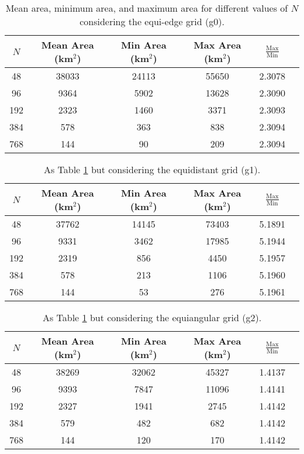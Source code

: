 \begin{table}[htbp]
    \centering
    \caption{Mean area, minimum area, and maximum area for different values of $N$ considering the equi-edge grid (g0).\label{g0-da-table}}
    \begin{tabular}{cccccc}
        \toprule
        $N$ & Mean Area (km$^2$) & Min Area (km$^2$) & Max Area (km$^2$) & $\frac{\text{Max}}{\text{Min}}$ \\
        \midrule
        48 & 38033 & 24113 & 55650 & 2.3078 \\
        96 & 9364 & 5902 & 13628 & 2.3090 \\
        192 & 2323 & 1460 & 3371 & 2.3093 \\
        384 & 578 & 363 & 838 & 2.3094 \\
        768 & 144 & 90 & 209 & 2.3094 \\
        \bottomrule
    \end{tabular}
\end{table}

\begin{table}[htbp]
    \centering
    \caption{As Table \ref{g0-da-table} but considering the equidistant grid (g1). \label{g1-da-table}}
    \begin{tabular}{cccccc}
        \toprule
        $N$ & Mean Area (km$^2$) & Min Area (km$^2$) & Max Area (km$^2$) & $\frac{\text{Max}}{\text{Min}}$ \\
        \midrule
        48 & 37762 & 14145 & 73403 & 5.1891 \\
        96 & 9331 & 3462 & 17985 & 5.1944 \\
        192 & 2319 & 856 & 4450 & 5.1957 \\
        384 & 578 & 213 & 1106 & 5.1960 \\
        768 & 144 & 53 & 276 & 5.1961 \\
        \bottomrule
    \end{tabular}
\end{table}

\begin{table}[htbp]
    \centering
    \caption{As Table \ref{g0-da-table} but considering the equiangular grid (g2). \label{g2-da-table}}
    \begin{tabular}{cccccc}
        \toprule
        $N$ & Mean Area (km$^2$) & Min Area (km$^2$) & Max Area (km$^2$) & $\frac{\text{Max}}{\text{Min}}$ \\
        \midrule
        48 & 38269 & 32062 & 45327 & 1.4137 \\
        96 & 9393 & 7847 & 11096 & 1.4141 \\
        192 & 2327 & 1941 & 2745 & 1.4142 \\
        384 & 579 & 482 & 682 & 1.4142 \\
        768 & 144 & 120 & 170 & 1.4142 \\
        \bottomrule
    \end{tabular}
\end{table}


